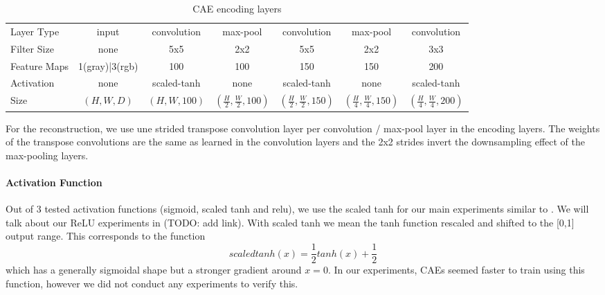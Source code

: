 \documentclass{article}
\begin{document}
    \begin{table}[h]
      \begin{center}
        \begin{tabular}{ l|c c c c c c }
          Layer Type    &   input   & convolution     & max-pool  & convolution & max-pool  & convolution \\
          Filter Size   &   none    & 5x5             & 2x2       & 5x5         & 2x2       & 3x3         \\
          Feature Maps&   1(gray)|3(rgb)   & 100             & 100       & 150         & 150       & 200         \\
          Activation    &   none    & scaled-tanh     & none      & scaled-tanh & none      & scaled-tanh \\
          Size          & $(H,W,D)$ & $(H,W,100)$     & $(\frac{H}{2}, \frac{W}{2}, 100)$ & $(\frac{H}{2}, \frac{W}{2}, 150)$ & $(\frac{H}{4}, \frac{W}{4}, 150)$ & $(\frac{H}{4}, \frac{W}{4}, 200)$
        \end{tabular}
      \end{center}
      \caption{CAE encoding layers}
      \label{table:encoding_architecture}
    \end{table}



    For the reconstruction, we use une strided transpose convolution layer per convolution / max-pool layer in the encoding layers. The weights of the transpose convolutions are the same as learned in the convolution layers and the 2x2 strides invert the downsampling effect of the max-pooling layers.

    \paragraph{Activation Function} Out of 3 tested activation functions (sigmoid, scaled tanh and relu), we use the scaled tanh for our main experiments similar to \citep{masci2011stacked}. We will talk about our ReLU experiments in (TODO: add link). With scaled tanh we mean the tanh function rescaled and shifted to the [0,1] output range. This corresponds to the function $$scaledtanh(x) = \frac{1}{2}tanh(x) + \frac{1}{2}$$ which has a generally sigmoidal shape but a stronger gradient around $x = 0$. In our experiments, CAEs seemed faster to train using this function, however we did not conduct any experiments to verify this.
\end{document}
